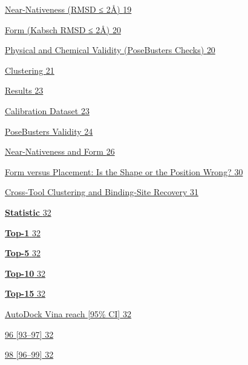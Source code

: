 \protect\hyperlink{near-nativeness-rmsd-2uxe5}{Near-Nativeness (RMSD ≤ 2Å) \protect\hyperlink{near-nativeness-rmsd-2uxe5}{19}}

\protect\hyperlink{_Toc235735889}{Form (Kabsch RMSD ≤ 2Å) \protect\hyperlink{_Toc235735889}{20}}

\protect\hyperlink{physical-and-chemical-validity-posebusters-checks}{Physical and Chemical Validity (PoseBusters Checks) \protect\hyperlink{physical-and-chemical-validity-posebusters-checks}{20}}

\protect\hyperlink{clustering}{Clustering \protect\hyperlink{clustering}{21}}

\protect\hyperlink{results}{Results \protect\hyperlink{results}{23}}

\protect\hyperlink{calibration-dataset-1}{Calibration Dataset \protect\hyperlink{calibration-dataset-1}{23}}

\protect\hyperlink{_Toc235735894}{PoseBusters Validity \protect\hyperlink{_Toc235735894}{24}}

\protect\hyperlink{near-nativeness-and-form}{Near-Nativeness and Form \protect\hyperlink{near-nativeness-and-form}{26}}

\protect\hyperlink{_Toc235735896}{Form versus Placement: Is the Shape or the Position Wrong? \protect\hyperlink{_Toc235735896}{30}}

\protect\hyperlink{cross-tool-clustering}{Cross-Tool Clustering and Binding-Site Recovery \protect\hyperlink{cross-tool-clustering}{31}}

\protect\hyperlink{_Toc235735898}{\textbf{Statistic} \protect\hyperlink{_Toc235735898}{32}}

\protect\hyperlink{_Toc235735899}{\textbf{Top-1} \protect\hyperlink{_Toc235735899}{32}}

\protect\hyperlink{_Toc235735900}{\textbf{Top-5} \protect\hyperlink{_Toc235735900}{32}}

\protect\hyperlink{_Toc235735901}{\textbf{Top-10} \protect\hyperlink{_Toc235735901}{32}}

\protect\hyperlink{_Toc235735902}{\textbf{Top-15} \protect\hyperlink{_Toc235735902}{32}}

\protect\hyperlink{_Toc235735903}{AutoDock Vina reach {[}95\% CI{]} \protect\hyperlink{_Toc235735903}{32}}

\protect\hyperlink{_Toc235735904}{96 {[}93--97{]} \protect\hyperlink{_Toc235735904}{32}}

\protect\hyperlink{_Toc235735905}{98 {[}96--99{]} \protect\hyperlink{_Toc235735905}{32}}

